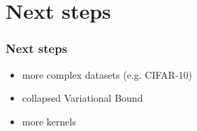 \documentclass{beamer}
\begin{document}
        \section{Next steps}
        \begin{frame}
            \frametitle{Next steps}
            \begin{itemize}
                \item more complex datasets (e.g. CIFAR-10)
                \item collapsed Variational Bound
                \item more kernels
            \end{itemize}
        \end{frame}



\end{document}
